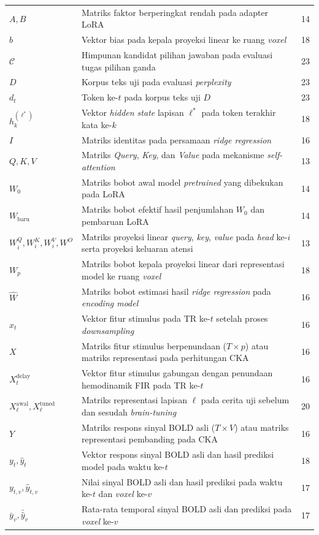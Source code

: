 \begin{longtable}{@{} l >{\raggedright\arraybackslash}p{6.5cm} c @{}}
$A, B$ & Matriks faktor berperingkat rendah pada adapter LoRA & 14 \\
$b$ & Vektor bias pada kepala proyeksi linear ke ruang \textit{voxel} & 18 \\
$\mathcal{C}$ & Himpunan kandidat pilihan jawaban pada evaluasi tugas pilihan ganda & 23 \\
$D$ & Korpus teks uji pada evaluasi \textit{perplexity} & 23 \\
$d_t$ & Token ke-$t$ pada korpus teks uji $D$ & 23 \\
$h_k^{(\ell^*)}$ & Vektor \textit{hidden state} lapisan $\ell^*$ pada token terakhir kata ke-$k$ & 18 \\
$I$ & Matriks identitas pada persamaan \textit{ridge regression} & 16 \\
$Q, K, V$ & Matriks \textit{Query}, \textit{Key}, dan \textit{Value} pada mekanisme \textit{self-attention} & 13 \\
$W_0$ & Matriks bobot awal model \textit{pretrained} yang dibekukan pada LoRA & 14 \\
$W_{\text{baru}}$ & Matriks bobot efektif hasil penjumlahan $W_0$ dan pembaruan LoRA & 14 \\
$W_i^Q, W_i^K, W_i^V, W^O$ & Matriks proyeksi linear \textit{query}, \textit{key}, \textit{value} pada \textit{head} ke-$i$ serta proyeksi keluaran atensi & 13 \\
$W_p$ & Matriks bobot kepala proyeksi linear dari representasi model ke ruang \textit{voxel} & 18 \\
$\hat{W}$ & Matriks bobot estimasi hasil \textit{ridge regression} pada \textit{encoding model} & 16 \\
$x_t$ & Vektor fitur stimulus pada TR ke-$t$ setelah proses \textit{downsampling} & 16 \\
$X$ & Matriks fitur stimulus berpenundaan ($T \times p$) atau matriks representasi pada perhitungan CKA & 16 \\
$X_t^{\text{delay}}$ & Vektor fitur stimulus gabungan dengan penundaan hemodinamik FIR pada TR ke-$t$ & 16 \\
$X_\ell^{\text{awal}}, X_\ell^{\text{tuned}}$ & Matriks representasi lapisan $\ell$ pada cerita uji sebelum dan sesudah \textit{brain-tuning} & 20 \\
$Y$ & Matriks respons sinyal BOLD asli ($T \times V$) atau matriks representasi pembanding pada CKA & 16 \\
$y_t, \hat{y}_t$ & Vektor respons sinyal BOLD asli dan hasil prediksi model pada waktu ke-$t$ & 18 \\
$y_{t,v}, \hat{y}_{t,v}$ & Nilai sinyal BOLD asli dan hasil prediksi pada waktu ke-$t$ dan \textit{voxel} ke-$v$ & 17 \\
$\bar{y}_v, \bar{\hat{y}}_v$ & Rata-rata temporal sinyal BOLD asli dan prediksi pada \textit{voxel} ke-$v$ & 17 \\[1ex]


\end{longtable}
